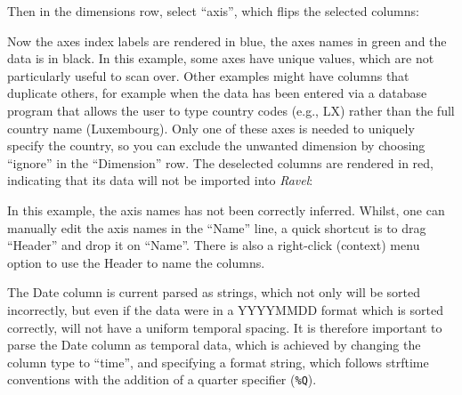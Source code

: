 Then in the dimensions row, select ``axis'', which flips the selected
columns:
\begin{center}
\par\end{center}

Now the axes index labels are rendered in blue, the axes names in
green and the data is in black. In this example, some axes have unique
values, which are not particularly useful to scan over. Other examples
might have columns that duplicate others, for example when the data
has been entered via a database program that allows the user to type
country codes (e.g., LX) rather than the full country name (Luxembourg).
Only one of these axes is needed to uniquely specify the country,
so you can exclude the unwanted dimension by choosing ``ignore''
in the ``Dimension'' row. The deselected columns are rendered in
red, indicating that its data will not be imported into \emph{Ravel}:
\begin{center}
\par\end{center}

In this example, the axis names has not been correctly inferred. Whilst,
one can manually edit the axis names in the ``Name'' line, a quick
shortcut is to drag ``Header'' and drop it on ``Name''. There
is also a right-click (context) menu option to use the Header to name
the columns.
\begin{center}
\par\end{center}

The Date column is current parsed as strings, which not only will
be sorted incorrectly, but even if the data were in a YYYYMMDD format
which is sorted correctly, will not have a uniform temporal spacing.
It is therefore important to parse the Date column as temporal data,
which is achieved by changing the column type to ``time'', and specifying
a format string, which follows strftime conventions with the addition
of a quarter specifier (\verb+%Q+). \label{strftime format specifier}

